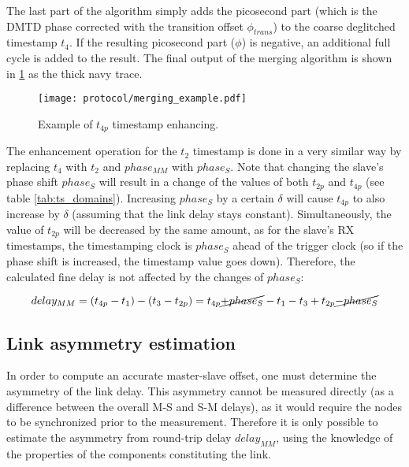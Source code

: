 The last part of the algorithm simply adds the picosecond part (which is
the DMTD phase corrected with the transition offset $\phi_{trans}$) to
the coarse deglitched timestamp $t_{4}$. If the resulting picosecond part
($\phi$) is negative, an additional full cycle is added to the result. The
final output of the merging algorithm is shown in \ref{fig:merging_example}
as the thick navy trace.
 \begin{figure}[ht!]
  \centering
  \texttt{[image: protocol/merging\_example.pdf]}
  \caption{Example of $t_{4p}$ timestamp enhancing.}
  \label{fig:merging_example}
\end{figure}
The enhancement operation for the $t_{2}$ timestamp is done in a very
similar way by replacing $t_{4}$ with $t_{2}$ and $phase_{MM}$ with
$phase_{S}$. Note that changing the slave's phase shift $phase_{S}$ will
result in a change of the values of both $t_{2p}$ and $t_{4p}$ (see table
\ref{tab:ts_domains}). Increasing $phase_{S}$ by a certain $\delta$ will
cause $t_{4p}$ to also increase by $\delta$ (assuming that the link delay
stays constant). Simultaneously, the value of $t_{2p}$ will be decreased by
the same amount, as for the slave's RX timestamps, the timestamping clock is
$phase_{S}$ ahead of the trigger clock (so if the phase shift is increased,
the timestamp value goes down). Therefore, the calculated fine delay is not
affected by the changes of $phase_{S}$:

\begin{equation}
\label{eq:ptp_precise2}
delay_{MM} = (t_{4p} - t_{1}) - (t_{3} - t_{2p}) = t_{4p} \cancel{+ phase_{S}}
- t_{1} - t_{3} + t_{2p} \cancel{-phase_{S}}
\end{equation}


\subsection{Link asymmetry estimation}
\label{s:asymmetry}
In order to compute an accurate master-slave offset, one must determine the
asymmetry of the link delay. This asymmetry cannot be measured directly (as
a difference between the overall M-S and S-M delays), as it would require
the nodes to be synchronized prior to the measurement. Therefore it is
only possible to estimate the asymmetry from round-trip delay $delay_{MM}$,
using the knowledge of the properties of the components constituting the link.

